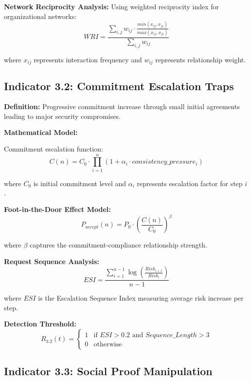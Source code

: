 \documentclass[11pt,a4paper]{article}
\begin{document}
\textbf{Network Reciprocity Analysis:}
Using weighted reciprocity index for organizational networks:
\begin{equation}
WRI = \frac{\sum_{i,j} w_{ij} \cdot \frac{min(x_{ij}, x_{ji})}{max(x_{ij}, x_{ji})}}{\sum_{i,j} w_{ij}}
\end{equation}

where $x_{ij}$ represents interaction frequency and $w_{ij}$ represents relationship weight.

\subsection{Indicator 3.2: Commitment Escalation Traps}

\textbf{Definition:} Progressive commitment increase through small initial agreements leading to major security compromises.

\textbf{Mathematical Model:}

Commitment escalation function:
\begin{equation}
C(n) = C_0 \cdot \prod_{i=1}^{n} (1 + \alpha_i \cdot consistency\_pressure_i)
\end{equation}

where $C_0$ is initial commitment level and $\alpha_i$ represents escalation factor for step $i$.

\textbf{Foot-in-the-Door Effect Model:}
\begin{equation}
P_{accept}(n) = P_0 \cdot \left(\frac{C(n)}{C_0}\right)^{\beta}
\end{equation}

where $\beta$ captures the commitment-compliance relationship strength.

\textbf{Request Sequence Analysis:}
\begin{equation}
ESI = \frac{\sum_{i=1}^{n-1} \log\left(\frac{Risk_{i+1}}{Risk_i}\right)}{n-1}
\end{equation}

where $ESI$ is the Escalation Sequence Index measuring average risk increase per step.

\textbf{Detection Threshold:}
\begin{equation}
R_{3.2}(t) = \begin{cases}
1 & \text{if } ESI > 0.2 \text{ and } Sequence\_Length > 3 \\
0 & \text{otherwise}
\end{cases}
\end{equation}

\subsection{Indicator 3.3: Social Proof Manipulation}
\end{document}
